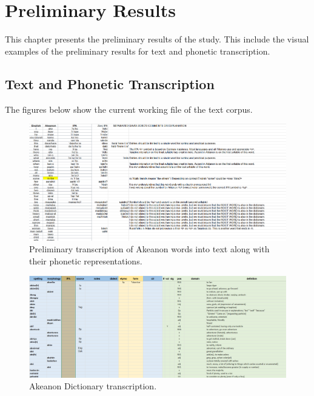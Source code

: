 \chapter{Preliminary Results}
This chapter presents the preliminary results of the study. This include the visual examples of the preliminary results for text and phonetic transcription.

\section{Text and Phonetic Transcription}
\label{sec:TextandPhonetic}

The figures below show the current working file of the text corpus.

\begin{figure}[h!]
	\centering
	\includegraphics[width=\textwidth]{./appendix/prelim_transcription.png}
	\caption{Preliminary transcription of Akeanon words into text along with their phonetic representations.}
	\label{fig:PreliminaryTranscription}
\end{figure}
\label{sec:TextandPhonetic2}

\begin{figure}[h!]
	\centering
	\includegraphics[width=\textwidth]{./appendix/dictionary.png}
	\caption{Akeanon Dictionary transcription.}
	\label{fig:Transcripted Akeanon Dictionary}
\end{figure}

